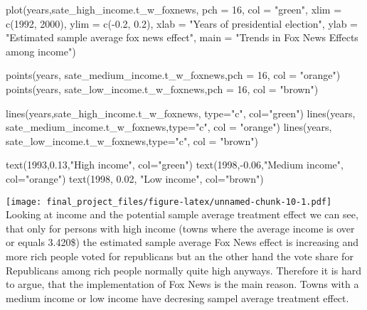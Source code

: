\documentclass[
]{article}
\newenvironment{Shaded}{\begin{snugshade}}{\end{snugshade}}
\newcommand{\AttributeTok}[1]{\textcolor[rgb]{0.77,0.63,0.00}{#1}}
\newcommand{\DecValTok}[1]{\textcolor[rgb]{0.00,0.00,0.81}{#1}}
\newcommand{\FloatTok}[1]{\textcolor[rgb]{0.00,0.00,0.81}{#1}}
\newcommand{\FunctionTok}[1]{\textcolor[rgb]{0.00,0.00,0.00}{#1}}
\newcommand{\NormalTok}[1]{#1}
\newcommand{\SpecialCharTok}[1]{\textcolor[rgb]{0.00,0.00,0.00}{#1}}
\newcommand{\StringTok}[1]{\textcolor[rgb]{0.31,0.60,0.02}{#1}}
\begin{document}
\begin{Shaded}
\begin{Highlighting}[]
\FunctionTok{plot}\NormalTok{(years,sate\_high\_income.t\_w\_foxnews, }\AttributeTok{pch =} \DecValTok{16}\NormalTok{, }\AttributeTok{col =} \StringTok{"green"}\NormalTok{,}
\AttributeTok{xlim =} \FunctionTok{c}\NormalTok{(}\DecValTok{1992}\NormalTok{, }\DecValTok{2000}\NormalTok{), }\AttributeTok{ylim =} \FunctionTok{c}\NormalTok{(}\SpecialCharTok{{-}}\FloatTok{0.2}\NormalTok{, }\FloatTok{0.2}\NormalTok{), }\AttributeTok{xlab =} \StringTok{"Years of presidential election"}\NormalTok{,}
\AttributeTok{ylab =} \StringTok{"Estimated sample average fox news effect"}\NormalTok{,}
\AttributeTok{main =} \StringTok{"Trends in Fox News Effects among income"}\NormalTok{)}

\FunctionTok{points}\NormalTok{(years, sate\_medium\_income.t\_w\_foxnews,}\AttributeTok{pch =} \DecValTok{16}\NormalTok{, }\AttributeTok{col =} \StringTok{"orange"}\NormalTok{)}
\FunctionTok{points}\NormalTok{(years, sate\_low\_income.t\_w\_foxnews,}\AttributeTok{pch =} \DecValTok{16}\NormalTok{, }\AttributeTok{col =} \StringTok{"brown"}\NormalTok{)}


\FunctionTok{lines}\NormalTok{(years,sate\_high\_income.t\_w\_foxnews, }\AttributeTok{type=}\StringTok{"c"}\NormalTok{, }\AttributeTok{col=}\StringTok{"green"}\NormalTok{)}
\FunctionTok{lines}\NormalTok{(years, sate\_medium\_income.t\_w\_foxnews,}\AttributeTok{type=}\StringTok{"c"}\NormalTok{, }\AttributeTok{col =} \StringTok{"orange"}\NormalTok{)}
\FunctionTok{lines}\NormalTok{(years, sate\_low\_income.t\_w\_foxnews,}\AttributeTok{type=}\StringTok{"c"}\NormalTok{, }\AttributeTok{col =} \StringTok{"brown"}\NormalTok{)}

\FunctionTok{text}\NormalTok{(}\DecValTok{1993}\NormalTok{,}\FloatTok{0.13}\NormalTok{,}\StringTok{"High income"}\NormalTok{, }\AttributeTok{col=}\StringTok{"green"}\NormalTok{)}
\FunctionTok{text}\NormalTok{(}\DecValTok{1998}\NormalTok{,}\SpecialCharTok{{-}}\FloatTok{0.06}\NormalTok{,}\StringTok{"Medium income"}\NormalTok{, }\AttributeTok{col=}\StringTok{"orange"}\NormalTok{)}
\FunctionTok{text}\NormalTok{(}\DecValTok{1998}\NormalTok{, }\FloatTok{0.02}\NormalTok{, }\StringTok{"Low income"}\NormalTok{, }\AttributeTok{col=}\StringTok{"brown"}\NormalTok{)}
\end{Highlighting}
\end{Shaded}

\texttt{[image: final\_project\_files/figure-latex/unnamed-chunk-10-1.pdf]}
Looking at income and the potential sample average treatment effect we can see, that only for persons with high income (towns where the average income is over or equals 3.420\$) the estimated sample average Fox News effect is increasing and more rich people voted for republicans but an the other hand the vote share for Republicans among rich people normally quite high anyways. Therefore it is hard to argue, that the implementation of Fox News is the main reason. Towns with a medium income or low income have decresing sampel average treatment effect.
\end{document}
